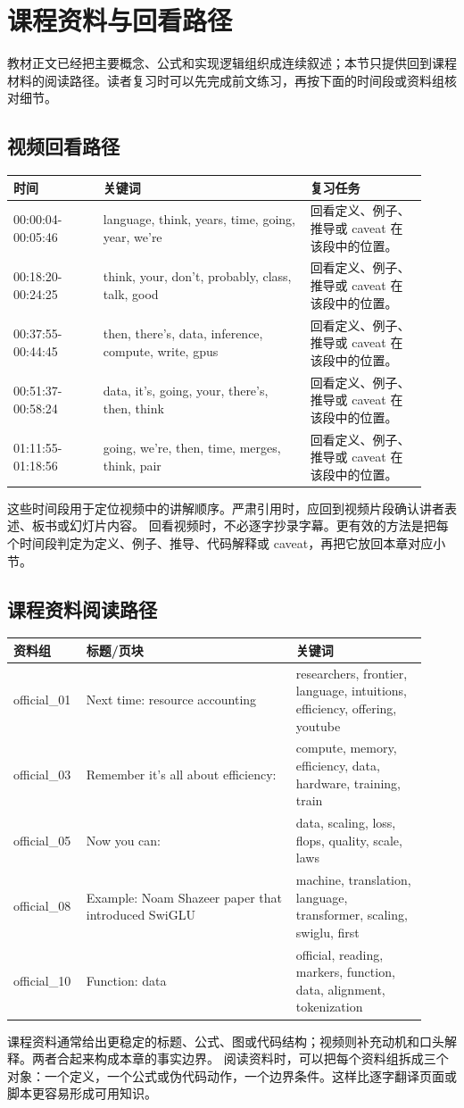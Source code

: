 \documentclass[a4paper]{article}
\begin{document}
\section{课程资料与回看路径}
教材正文已经把主要概念、公式和实现逻辑组织成连续叙述；本节只提供回到课程材料的阅读路径。读者复习时可以先完成前文练习，再按下面的时间段或资料组核对细节。
\subsection{视频回看路径}
\begin{longtable}{p{0.20\linewidth}p{0.46\linewidth}p{0.26\linewidth}}
\toprule
\textbf{时间} & \textbf{关键词} & \textbf{复习任务}\\
\midrule
00:00:04-00:05:46 & language, think, years, time, going, year, we're & 回看定义、例子、推导或 caveat 在该段中的位置。\\
00:18:20-00:24:25 & think, your, don't, probably, class, talk, good & 回看定义、例子、推导或 caveat 在该段中的位置。\\
00:37:55-00:44:45 & then, there's, data, inference, compute, write, gpus & 回看定义、例子、推导或 caveat 在该段中的位置。\\
00:51:37-00:58:24 & data, it's, going, your, there's, then, think & 回看定义、例子、推导或 caveat 在该段中的位置。\\
01:11:55-01:18:56 & going, we're, then, time, merges, think, pair & 回看定义、例子、推导或 caveat 在该段中的位置。\\
\bottomrule
\end{longtable}
这些时间段用于定位视频中的讲解顺序。严肃引用时，应回到视频片段确认讲者表述、板书或幻灯片内容。
回看视频时，不必逐字抄录字幕。更有效的方法是把每个时间段判定为定义、例子、推导、代码解释或 caveat，再把它放回本章对应小节。
\subsection{课程资料阅读路径}
\begin{longtable}{p{0.14\linewidth}p{0.48\linewidth}p{0.30\linewidth}}
\toprule
\textbf{资料组} & \textbf{标题/页块} & \textbf{关键词}\\
\midrule
official\_01 & Next time: resource accounting & researchers, frontier, language, intuitions, efficiency, offering, youtube\\
official\_03 & Remember it's all about efficiency: & compute, memory, efficiency, data, hardware, training, train\\
official\_05 & Now you can: & data, scaling, loss, flops, quality, scale, laws\\
official\_08 & Example: Noam Shazeer paper that introduced SwiGLU & machine, translation, language, transformer, scaling, swiglu, first\\
official\_10 & Function: data & official, reading, markers, function, data, alignment, tokenization\\
\bottomrule
\end{longtable}
课程资料通常给出更稳定的标题、公式、图或代码结构；视频则补充动机和口头解释。两者合起来构成本章的事实边界。
阅读资料时，可以把每个资料组拆成三个对象：一个定义，一个公式或伪代码动作，一个边界条件。这样比逐字翻译页面或脚本更容易形成可用知识。
\end{document}
